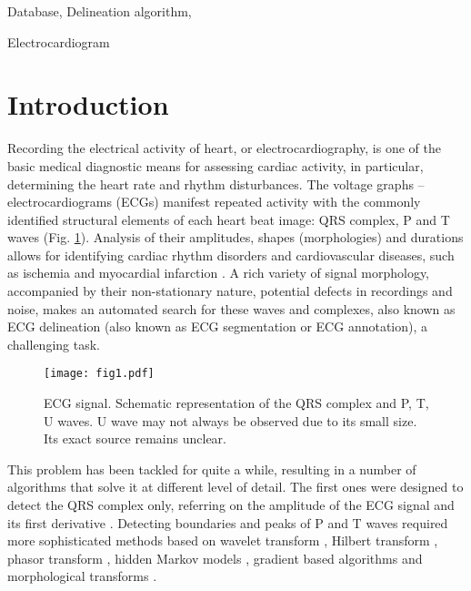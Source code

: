 \documentclass[submitted]{ieeeaccess}
\newcommand{\DeletedText}[1]{}
\newcommand{\NewCorrection}[1]{{#1}}
\begin{document}
\begin{keywords}
    Database,
    Delineation algorithm,
    \DeletedText{ECG,}
    Electrocardiogram
\end{keywords}




\titlepgskip=-15pt

\maketitle


\section*{Introduction}\label{introduction}

Recording the electrical activity of heart, or electrocardiography, is one of the basic medical diagnostic means for assessing cardiac activity, in particular, determining the heart rate and rhythm disturbances.
The voltage graphs -- electrocardiograms (ECGs) manifest repeated activity with the commonly identified structural elements of each heart beat image: QRS complex, P and T waves (Fig. \ref{fig1}). Analysis of their amplitudes, shapes (morphologies) and durations allows for identifying cardiac rhythm disorders and cardiovascular diseases, such as ischemia and myocardial infarction \cite{Khan2009}. A rich variety of signal morphology, accompanied by their non-stationary nature, potential defects in recordings and noise, makes an automated search for these waves and complexes, also known as ECG delineation \NewCorrection{(also known as ECG segmentation or ECG annotation)}, a challenging task.

\begin{figure}
    \centering
\texttt{[image: fig1.pdf]}
\caption{ECG signal. Schematic representation of \NewCorrection{the QRS complex and P, T, U waves. U wave may not always be observed due to its small size. Its exact source remains unclear.}}
\label{fig1}
\end{figure}


This problem has been tackled for quite a while, resulting in a number of algorithms that solve it at different level of detail. The first ones were designed to detect the QRS complex only, referring on the amplitude of the ECG signal and its first derivative \cite{Pan1985}. Detecting boundaries and peaks of P and T waves required more sophisticated methods based on wavelet transform \cite{Li1995, Martinez2004}, Hilbert transform \cite{Benitez2001}, phasor transform \cite{Martinez2010}, hidden Markov models \cite{Graja2005}, gradient based algorithms \cite{Mazomenos2012} and morphological transforms \cite{Sun2005}.
\end{document}
